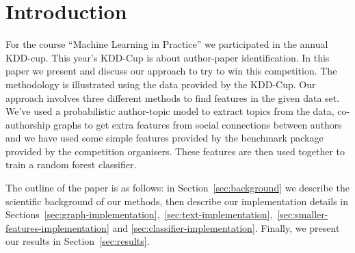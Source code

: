 \section*{Introduction}

For the course ``Machine Learning in Practice'' we participated in the annual KDD-cup.
This year's KDD-Cup is about author-paper identification.
In this paper we present and discuss our approach to try to win this competition.
The methodology is illustrated using the data provided by the KDD-Cup.
Our approach involves three different methods to find features in the given data set.
We've used a probabilistic author-topic model\cite{steyvers2004probabilistic} to extract topics from  the data, co-authorship graphs to get extra features from social connections between authors and we have used some simple features provided by the benchmark package provided by the competition organisers.
These features are then used together to train a random forest classifier.

The outline of the paper is as follows: in Section~\ref{sec:background} we describe the scientific background of our methods, then describe our implementation details in Sections~\ref{sec:graph-implementation},~\ref{sec:text-implementation},~\ref{sec:smaller-features-implementation} and \ref{sec:classifier-implementation}. Finally, we present our results in Section~\ref{sec:results}.
